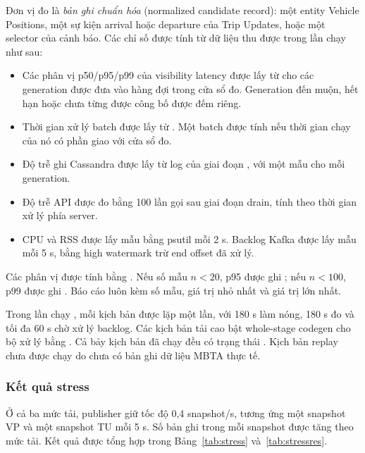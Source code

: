 Đơn vị đo là \textit{bản ghi chuẩn hóa} (normalized candidate record): một entity Vehicle Positions, một sự kiện arrival hoặc departure của Trip Updates, hoặc một selector của cảnh báo. Các chỉ số được tính từ dữ liệu thu được trong lần chạy như sau:
\begin{itemize}
    \item Các phân vị p50/p95/p99 của visibility latency được lấy từ  cho các generation được đưa vào hàng đợi trong cửa sổ đo. Generation đến muộn, hết hạn hoặc chưa từng được công bố được đếm riêng.
    \item Thời gian xử lý batch được lấy từ . Một batch được tính nếu thời gian chạy của nó có phần giao với cửa sổ đo.
    \item Độ trễ ghi Cassandra được lấy từ log của giai đoạn , với một mẫu cho mỗi generation.
    \item Độ trễ API được đo bằng 100 lần gọi  sau giai đoạn drain, tính theo thời gian xử lý phía server.
    \item CPU và RSS được lấy mẫu bằng psutil mỗi 2 s. Backlog Kafka được lấy mẫu mỗi 5 s, bằng high watermark trừ end offset đã xử lý.
\end{itemize}
Các phân vị được tính bằng . Nếu số mẫu $n<20$, p95 được ghi ; nếu $n<100$, p99 được ghi . Báo cáo luôn kèm số mẫu, giá trị nhỏ nhất và giá trị lớn nhất.

Trong lần chạy , mỗi kịch bản được lặp một lần, với 180 s làm nóng, 180 s đo và tối đa 60 s chờ xử lý backlog. Các kịch bản tải cao bật whole-stage codegen cho bộ xử lý bằng . Cả bảy kịch bản đã chạy đều có trạng thái . Kịch bản replay chưa được chạy do chưa có bản ghi dữ liệu MBTA thực tế.

\subsubsection{Kết quả stress}

Ở cả ba mức tải, publisher giữ tốc độ 0,4 snapshot/s, tương ứng một snapshot VP và một snapshot TU mỗi 5 s. Số bản ghi trong mỗi snapshot được tăng theo mức tải. Kết quả được tổng hợp trong Bảng~\ref{tab:stress} và~\ref{tab:stressres}.

